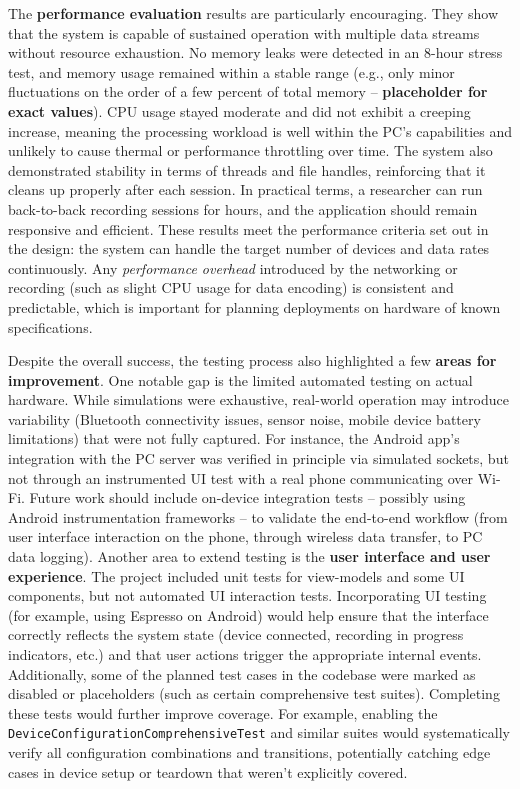 \documentclass[12pt,a4paper]{article}
\begin{document}
The \textbf{performance evaluation} results are particularly encouraging. They show that the system is capable of sustained operation with multiple data streams without resource exhaustion. No memory leaks were detected in an 8-hour stress test, and memory usage remained within a stable range (e.g., only minor fluctuations on the order of a few percent of total memory -- \textbf{placeholder for exact values}). CPU usage stayed moderate and did not exhibit a creeping increase, meaning the processing workload is well within the PC's capabilities and unlikely to cause thermal or performance throttling over time. The system also demonstrated stability in terms of threads and file handles, reinforcing that it cleans up properly after each session. In practical terms, a researcher can run back-to-back recording sessions for hours, and the application should remain responsive and efficient. These results meet the performance criteria set out in the design: the system can handle the target number of devices and data rates continuously. Any \emph{performance overhead} introduced by the networking or recording (such as slight CPU usage for data encoding) is consistent and predictable, which is important for planning deployments on hardware of known specifications.

Despite the overall success, the testing process also highlighted a few \textbf{areas for improvement}. One notable gap is the limited automated testing on actual hardware. While simulations were exhaustive, real-world operation may introduce variability (Bluetooth connectivity issues, sensor noise, mobile device battery limitations) that were not fully captured. For instance, the Android app's integration with the PC server was verified in principle via simulated sockets, but not through an instrumented UI test with a real phone communicating over Wi-Fi. Future work should include on-device integration tests -- possibly using Android instrumentation frameworks -- to validate the end-to-end workflow (from user interface interaction on the phone, through wireless data transfer, to PC data logging). Another area to extend testing is the \textbf{user interface and user experience}. The project included unit tests for view-models and some UI components, but not automated UI interaction tests. Incorporating UI testing (for example, using Espresso on Android) would help ensure that the interface correctly reflects the system state (device connected, recording in progress indicators, etc.) and that user actions trigger the appropriate internal events. Additionally, some of the planned test cases in the codebase were marked as disabled or placeholders (such as certain comprehensive test suites). Completing these tests would further improve coverage. For example, enabling the \passthrough{\lstinline!DeviceConfigurationComprehensiveTest!} and similar suites would systematically verify all configuration combinations and transitions, potentially catching edge cases in device setup or teardown that weren't explicitly covered.
\end{document}
